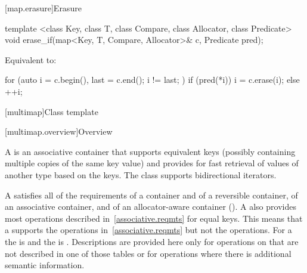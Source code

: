 [map.erasure]{Erasure}

%
\begin{itemdecl}
template <class Key, class T, class Compare, class Allocator, class Predicate>
  void erase_if(map<Key, T, Compare, Allocator>& c, Predicate pred);
\end{itemdecl}

\begin{itemdescr}
\pnum
\effects
Equivalent to:
\begin{codeblock}
for (auto i = c.begin(), last = c.end(); i != last; ) {
  if (pred(*i)) {
    i = c.erase(i);
  } else {
    ++i;
  }
}
\end{codeblock}
\end{itemdescr}

[multimap]{Class template }

[multimap.overview]{Overview}

\pnum
{}%
A
is an associative container that supports equivalent keys (possibly containing multiple copies of
the same key value) and provides for fast retrieval of values of another type
based on the keys.
The
class
supports bidirectional iterators.

\pnum
A
 satisfies all of the requirements of a container and of a
reversible container, of an associative
container, and of an allocator-aware container
().
A
also provides most operations described in~\ref{associative.reqmts}
for equal keys.
This means that a
supports the
operations in~\ref{associative.reqmts}
but not the
operations.
For a
the
is
and the
is
.
Descriptions are provided here only for operations on
that are not described in one of those tables
or for operations where there is additional semantic information.

